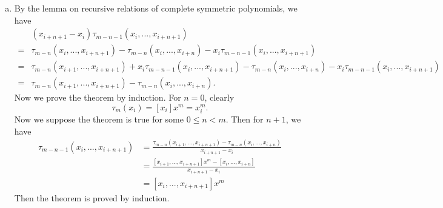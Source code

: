\documentclass[11pt]{elegantbook}
\begin{document}
\begin{solution}
\begin{enumerate}[(a)]
    \item By the lemma on recursive relations of complete symmetric polynomials, we have
    \begin{align*}
      &(x_{i+n+1}-x_i)\tau_{m-n-1}(x_i,...,x_{i+n+1})\\
      =&\tau_{m-n}(x_i,...,x_{i+n+1})-\tau_{m-n}(x_i,...,x_{i+n})-x_i\tau_{m-n-1}(x_i,...,x_{i+n+1})\\
      =&\tau_{m-n}(x_{i+1},...,x_{i+n+1})+x_i\tau_{m-n-1}(x_i,...,x_{i+n+1})-\tau_{m-n}(x_i,...,x_{i+n})-x_i\tau_{m-n-1}(x_i,...,x_{i+n+1})\\
      =&\tau_{m-n}(x_{i+1},...,x_{i+n+1})-\tau_{m-n}(x_i,...,x_{i+n}).
    \end{align*}
    Now we prove the theorem by induction. For $n=0$, clearly
    \begin{equation*}
      \tau_m(x_i)=[x_i]x^m=x_i^m.
    \end{equation*}
    Now we suppose the theorem is true for some $0\leq n<m$. Then for $n+1$, we have
    \begin{align*}
      \tau_{m-n-1}(x_i,...,x_{i+n+1})&=\frac{\tau_{m-n}(x_{i+1},...,x_{i+n+1})-\tau_{m-n}(x_i,...,x_{i+n})}{x_{i+n+1}-x_{i}}\\
      &=\frac{[x_{i+1},...,x_{i+n+1}]x^m-[x_i,...,x_{i+n}]}{x_{i+n+1}-x_{i}}\\
      &=[x_i,...,x_{i+n+1}]x^m
    \end{align*}
    Then the theorem is proved by induction.
  \end{enumerate}
\end{solution}
\end{document}
